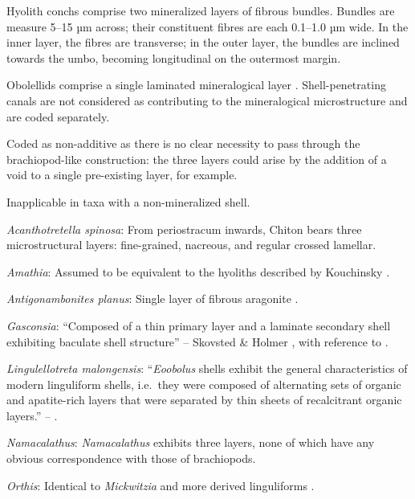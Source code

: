 \documentclass[openany]{book}
\theoremstyle{definition}
\theoremstyle{definition}
\theoremstyle{definition}
\theoremstyle{remark}
\begin{document}
Hyolith conchs comprise two mineralized layers of fibrous bundles.
Bundles are measure 5--15 µm across; their constituent fibres are each
0.1--1.0 µm wide. In the inner layer, the fibres are transverse; in the
outer layer, the bundles are inclined towards the umbo, becoming
longitudinal on the outermost margin.

Obolellids comprise a single laminated mineralogical layer
\citep{Balthasar2008iMummpikia}. Shell-penetrating canals are not
considered as contributing to the mineralogical microstructure and are
coded separately.

Coded as non-additive as there is no clear necessity to pass through the
brachiopod-like construction: the three layers could arise by the
addition of a void to a single pre-existing layer, for example.

Inapplicable in taxa with a non-mineralized shell.

\hypertarget{Acanthotretella_spinosa-coding-126}{}
\emph{Acanthotretella spinosa}: From periostracum inwards, Chiton bears
three microstructural layers: fine-grained, nacreous, and regular
crossed lamellar.

\hypertarget{Amathia-coding-126}{}
\emph{Amathia}: Assumed to be equivalent to the hyoliths described by
Kouchinsky \citeyearpar{Kouchinsky2000Skeletalmicrostructures}.

\hypertarget{Antigonambonites_planus-coding-126}{}
\emph{Antigonambonites planus}: Single layer of fibrous aragonite
\citep{Porter2008}.

\hypertarget{Gasconsia-coding-126}{}
\emph{Gasconsia}: ``Composed of a thin primary layer and a laminate
secondary shell exhibiting baculate shell structure'' -- Skovsted \&
Holmer \citeyearpar{Skovsted2005EarlyCambrian}, with reference to
\citet{Skovsted2003EarlyCambrian}.

\hypertarget{Lingulellotreta_malongensis-coding-126}{}
\emph{Lingulellotreta malongensis}: ``\emph{Eoobolus} shells exhibit the
general characteristics of modern linguliform shells, i.e.~they were
composed of alternating sets of organic and apatite-rich layers that
were separated by thin sheets of recalcitrant organic layers.'' --
\citet{Balthasar2007Anearly}.

\hypertarget{Namacalathus-coding-126}{}
\emph{Namacalathus}: \emph{Namacalathus} exhibits three layers, none of
which have any obvious correspondence with those of brachiopods.

\hypertarget{Orthis-coding-126}{}
\emph{Orthis}: Identical to \emph{Mickwitzia} and more derived
linguliforms \citep{Holmer2011Firstrecord}.
\end{document}
